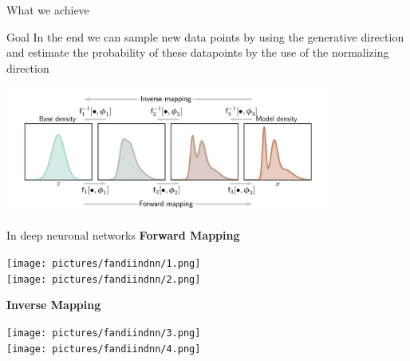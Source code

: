\documentclass[aspectratio=169,xcolor=dvipsnames]{beamer}
\begin{document}
\begin{frame}{What we achieve}
  \begin{block}{Goal}
    In the end we can sample new data points by using the generative direction and estimate the probability of these datapoints by the use of the normalizing direction
  \end{block}
  
  \begin{center}
  \includegraphics[width=0.8\textwidth]{pictures/forandinv.png}
  \end{center}
\end{frame}


\begin{frame}{In deep neuronal networks}
\textbf{Forward Mapping}
\begin{center}
  \texttt{[image: pictures/fandiindnn/1.png]}\\[0.4cm]
  \texttt{[image: pictures/fandiindnn/2.png]}
\end{center}
\vspace{0.4cm}

\textbf{Inverse Mapping}
\begin{center}
  \texttt{[image: pictures/fandiindnn/3.png]}\\[0.4cm]
  \texttt{[image: pictures/fandiindnn/4.png]}
\end{center}
\end{frame}

\end{document}
